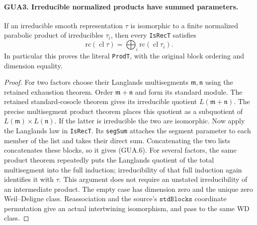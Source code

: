 \paragraph{GUA3. Irreducible normalized products have summed parameters.}
\label{claim:GUA3}
If an irreducible smooth representation $\tau$ is isomorphic
to a finite normalized parabolic product of irreducibles
$\tau_i$, then every \texttt{IsRecT} satisfies
\[
          \mathrm{rc}(\operatorname{cl}\tau)
                      =\bigoplus_i\mathrm{rc}(\operatorname{cl}\tau_i).
                                                        \tag{GUA.6}
\]
In particular this proves the literal \texttt{ProdT}, with
the original block ordering and dimension equality.
\begin{proof}
For two factors choose their Langlands multisegments
$\mathfrak m,\mathfrak n$ using the retained exhaustion
theorem.  Order $\mathfrak m+\mathfrak n$ and form its
standard module.  The retained standard-cosocle theorem
gives its irreducible quotient $L(\mathfrak m+\mathfrak n)$.
The precise multisegment product theorem places this quotient
as a subquotient of $L(\mathfrak m)\times L(\mathfrak n)$.
If the latter is irreducible the two are isomorphic.
Now apply the Langlands law in \texttt{IsRecT}.  Its
\texttt{segSum} attaches the segment parameter to each
member of the list and takes their direct sum.  Concatenating
the two lists concatenates these blocks, so it gives (GUA.6).
For several factors, the same product theorem repeatedly
puts the Langlands quotient of the total multisegment into
the full induction; irreducibility of that full induction
again identifies it with $\tau$.  This argument does not
require an unstated irreducibility of an intermediate product.
The empty case has dimension zero and the unique zero
Weil--Deligne class.  Reassociation and the source's
$\texttt{stdBlocks}$ coordinate permutation give an actual
intertwining isomorphism, and pass to the same WD class.
\end{proof}

